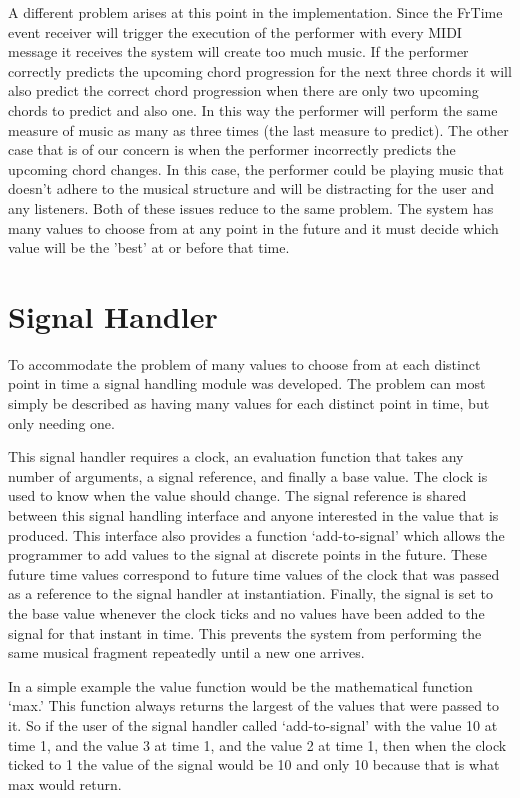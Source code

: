 \documentclass[12pt]{ucthesis}
\begin{document}
A different problem arises at this point in the implementation. Since the FrTime event receiver will trigger the execution of the performer with every MIDI message it receives the system will create too much music. If the performer correctly predicts the upcoming chord progression for the next three chords it will also predict the correct chord progression when there are only two upcoming chords to predict and also one. In this way the performer will perform the same measure of music as many as three times (the last measure to predict). The other case that is of our concern is when the performer incorrectly predicts the upcoming chord changes. In this case, the performer could be playing music that doesn't adhere to the musical structure and will be distracting for the user and any listeners. Both of these issues reduce to the same problem. The system has many values to choose from at any point in the future and it must decide which value will be the 'best' at or before that time.


\section{Signal Handler}
\label {signal-handler}

To accommodate the problem of many values to choose from at each distinct point in time a signal handling module was developed. The problem can most simply be described as having many values for each distinct point in time, but only needing one. 

This signal handler requires a clock, an evaluation function that takes any number of arguments, a signal reference, and finally a base value. The clock is used to know when the value should change. The signal reference is shared between this signal handling interface and anyone interested in the value that is produced. This interface also provides a function `add-to-signal' which allows the programmer to add values to the signal at discrete points in the future. These future time values correspond to future time values of the clock that was passed as a reference to the signal handler at instantiation. Finally, the signal is set to the base value whenever the clock ticks and no values have been added to the signal for that instant in time. This prevents the system from performing the same musical fragment repeatedly until a new one arrives. 

In a simple example the value function would be the mathematical function `max.' This function always returns the largest of the values that were passed to it. So if the user of the signal handler called `add-to-signal' with the value 10 at time 1, and the value 3 at time 1, and the value 2 at time 1, then when the clock ticked to 1 the value of the signal would be 10 and only 10 because that is what max would return. 
\end{document}
